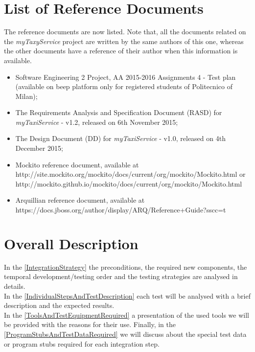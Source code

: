 \documentclass[\mainpath/main]{subfiles}
\begin{document}
\section{List of Reference Documents}
\label{Introduction:ReferenceDocuments}
The reference documents are now listed. Note that, all the documents related on the \textit{myTaxyService} project are written by the same authors of this one, whereas the other documents have a reference of their author when this information is available.\\
\begin{itemize}
	\item Software Engineering 2 Project, AA 2015-2016 Assignments 4 - Test plan (available on beep platform only for registered students of Politecnico of Milan);
	\item The Requirements Analysis and Specification Document (RASD) for \textit{myTaxiService} - v1.2, released on 6th November 2015;
	\item The Design Document (DD) for \textit{myTaxiService} - v1.0, released on 4th December 2015;
	\item Mockito reference document, available at\\ \small{http://site.mockito.org/mockito/docs/current/org/mockito/Mockito.html} or\\ \small{http://mockito.github.io/mockito/docs/current/org/mockito/Mockito.html}
	\item Arquillian reference document, available at\\
	\small{https://docs.jboss.org/author/display/ARQ/Reference+Guide?\textunderscore sscc=t}
\end{itemize}

\section{Overall Description}
\label{Introduction:Overall}
In the \autoref{IntegrationStrategy} the preconditions, the required new components, the temporal development/testing order and the testing strategies are analysed in details.\\
In the \autoref{IndividualStepsAndTestDescription} each test will be analysed with a brief description and the expected results.\\
In the \autoref{ToolsAndTestEquipmentRequired} a presentation of the used tools we will be provided with the reasons for their use. Finally, in the \autoref{ProgramStubsAndTestDataRequired} we will discuss about the special test data or program stubs required for each integration step.
\end{document}
